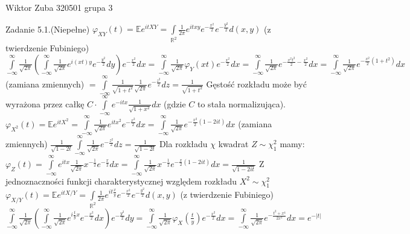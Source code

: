 \documentclass{article}
\begin{document}
Wiktor Zuba 320501 grupa 3
\newline

Zadanie 5.1.(Niepełne)
\newline
\newline
$\varphi_{XY}(t)=\mathbb{E}e^{itXY}=\int\limits_{\mathbb{R}^2}\frac{1}{2\pi}e^{itxy}e^{-\frac{x^2}{2}}e^{-\frac{y^2}{2}}d(x,y)$ (z twierdzenie Fubiniego)
$\int\limits_{-\infty}^{\infty}\frac{1}{\sqrt{2\pi}}\left(\int\limits_{-\infty}^{\infty}\frac{1}{\sqrt{2\pi}}e^{i(xt)y}e^{-\frac{y^2}{2}}dy\right)e^{-\frac{x^2}{2}}dx
=\int\limits_{-\infty}^{\infty}\frac{1}{\sqrt{2\pi}}\varphi_{Y}(xt)e^{-\frac{x^2}{2}}dx
=\int\limits_{-\infty}^{\infty}\frac{1}{\sqrt{2\pi}}e^{-\frac{x^2t^2}{2}-\frac{x^2}{2}}dx
=\int\limits_{-\infty}^{\infty}\frac{1}{\sqrt{2\pi}}e^{-\frac{x^2}{2}(1+t^2)}dx$ (zamiana zmiennych)
$=\int\limits_{-\infty}^{\infty}\frac{1}{\sqrt{1+t^2}}\frac{1}{\sqrt{2\pi}}e^{-\frac{z^2}{2}}dz
=\frac{1}{\sqrt{1+t^2}}$\newline
Gęstość rozkładu może być wyrażona przez całkę $C\cdot\int\limits_{-\infty}^{\infty}e^{-itx}\frac{1}{\sqrt{1+x^2}}dx$ (gdzie $C$ to stała normalizująca).\newline
$\varphi_{X^2}(t)=\mathbb{E}e^{itX^2}
=\int\limits_{-\infty}^{\infty}\frac{1}{\sqrt{2\pi}}e^{itx^2}e^{-\frac{x^2}{2}}dx
=\int\limits_{-\infty}^{\infty}\frac{1}{\sqrt{2\pi}}e^{-\frac{x^2}{2}(1-2it)}dx$ (zamiana zmiennych)
$\frac{1}{\sqrt{1-2t}}\int\limits_{-\infty}^{\infty}\frac{1}{\sqrt{2\pi}}e^{-\frac{z^2}{2}}dz=\frac{1}{\sqrt{1-2t}}$\newline
Dla rozkładu $\chi$ kwadrat $Z\sim \chi_1^2$ mamy:\newline
$\varphi_{Z}(t)=\int\limits_{-\infty}^{\infty}e^{itx}\frac{1}{\sqrt{2\pi}}x^{-\frac{1}{2}}e^{-\frac{x}{2}}dx
=\int\limits_{-\infty}^{\infty}\frac{1}{\sqrt{2\pi}}x^{-\frac{1}{2}}e^{-\frac{x}{2}(1-2it)}dx=\frac{1}{\sqrt{1-2it}}$\newline
Z jednoznaczności funkcji charakterystycznej względem rozkładu $X^2\sim \chi_1^2$\newline
$\varphi_{X/Y}(t)=\mathbb{E}e^{itX/Y}=
\int\limits_{\mathbb{R}^2}\frac{1}{2\pi}e^{it\frac{x}{y}}e^{-\frac{x^2}{2}}e^{-\frac{y^2}{2}}d(x,y)$ (z twierdzenie Fubiniego)
$\int\limits_{-\infty}^{\infty}\frac{1}{\sqrt{2\pi}}\left(\int\limits_{-\infty}^{\infty}\frac{1}{\sqrt{2\pi}}e^{i\frac{t}{y}x}e^{-\frac{x^2}{2}}dx\right)e^{-\frac{y^2}{2}}dy
=\int\limits_{-\infty}^{\infty}\frac{1}{\sqrt{2\pi}}\varphi_{X}(\frac{t}{y})e^{-\frac{x^2}{2}}dx
=\int\limits_{-\infty}^{\infty}\frac{1}{\sqrt{2\pi}}e^{-\frac{t^2+x^4}{2x^2}}dx=e^{-|t|}$\newline
\end{document}
